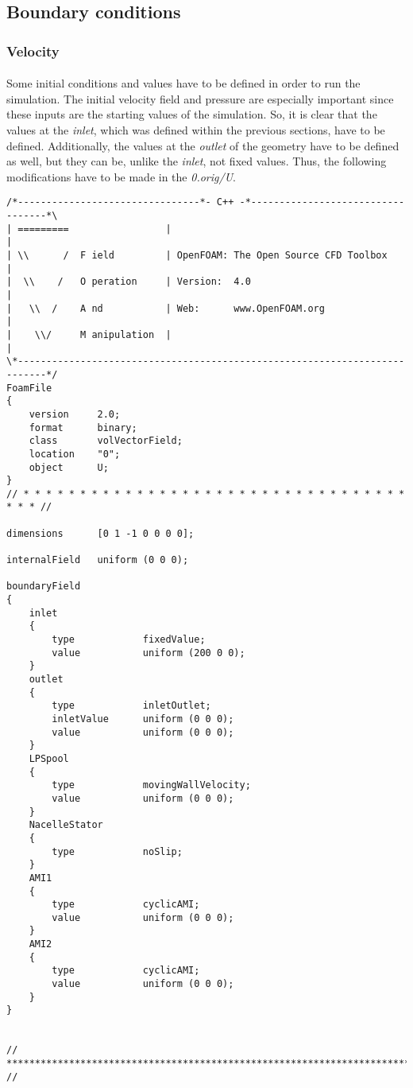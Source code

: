 \subsection{Boundary conditions}


\subsubsection{Velocity}

\paragraph{}Some initial conditions and values have to be defined in order to run the simulation. The initial velocity field and pressure are especially important since these inputs are the starting values of the simulation. So, it is clear that the values at the \textit{inlet}, which was defined within the previous sections, have to be defined. Additionally, the values at the \textit{outlet} of the geometry have to be defined as well, but they can be, unlike the \textit{inlet}, not fixed values. Thus, the following modifications have to be made in the  \textit{0.orig/U}.

\begin{footnotesize}
\begin{verbatim}
/*--------------------------------*- C++ -*----------------------------------*\
| =========                 |                                                 |
| \\      /  F ield         | OpenFOAM: The Open Source CFD Toolbox           |
|  \\    /   O peration     | Version:  4.0                                   |
|   \\  /    A nd           | Web:      www.OpenFOAM.org                      |
|    \\/     M anipulation  |                                                 |
\*---------------------------------------------------------------------------*/
FoamFile
{
    version     2.0;
    format      binary;
    class       volVectorField;
    location    "0";
    object      U;
}
// * * * * * * * * * * * * * * * * * * * * * * * * * * * * * * * * * * * * * //

dimensions      [0 1 -1 0 0 0 0];

internalField   uniform (0 0 0);

boundaryField
{
    inlet
    {
        type            fixedValue;
        value           uniform (200 0 0);
    }
    outlet
    {
        type            inletOutlet;
        inletValue      uniform (0 0 0);
        value           uniform (0 0 0);
    }
    LPSpool
    {
        type            movingWallVelocity;
        value           uniform (0 0 0);
    }
    NacelleStator
    {
        type            noSlip;
    }
    AMI1
    {
        type            cyclicAMI;
        value           uniform (0 0 0);
    }
    AMI2
    {
        type            cyclicAMI;
        value           uniform (0 0 0);
    }
}


// ************************************************************************* //
\end{verbatim}
\end{footnotesize}

